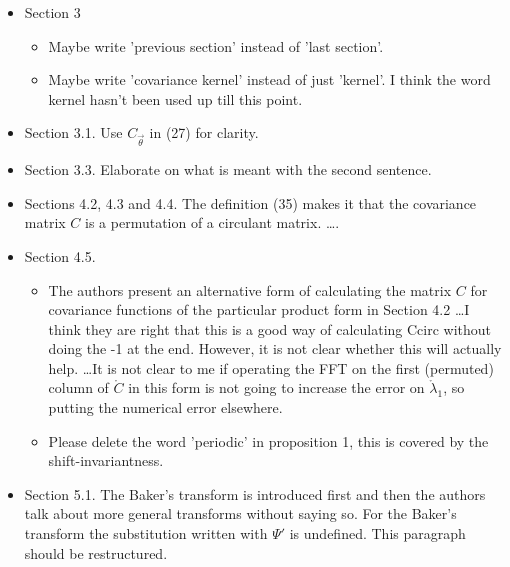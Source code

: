 \documentclass{amsart}
\begin{document}
\begin{itemize}
\item Section 3
\begin{itemize}
\item Maybe write 'previous section' instead of 'last section'.  
\item Maybe write 'covariance kernel' instead of just 'kernel'. I think the word
kernel hasn't been used up till this point.  
\end{itemize}

\item Section 3.1. Use $C_{\vec{\theta}}$ in (27) for clarity. 

\item Section 3.3. Elaborate on what is meant with the second sentence.  

\item Sections 4.2, 4.3 and 4.4. 
The definition (35) makes it that the covariance matrix $C$ is a permutation
of a circulant matrix. \ldots. 

\item  Section 4.5. 
\begin{itemize}
    \item The authors present an alternative form of calculating the matrix $C$ for
covariance functions of the particular product form in Section 4.2 \ldots I think they are right that this is a good
way of calculating Ccirc without doing the -1 at the end.
However, it is not clear whether this will actually help. \ldots It is not clear to me if operating
the FFT on the first (permuted) column of $\mathring{C}$ in this form is not going to
increase the error on $\mathring{\lambda}_1$, so putting the numerical error elsewhere.

\item Please delete the word 'periodic' in proposition 1, this is covered by the
shift-invariantness.
\end{itemize}

\item Section 5.1. The Baker's transform is introduced first and then the authors talk about
more general transforms without saying so. For the Baker's transform the
substitution written with $\Psi'$ is undefined. This paragraph should be
restructured.

\end{itemize}
\end{document}
